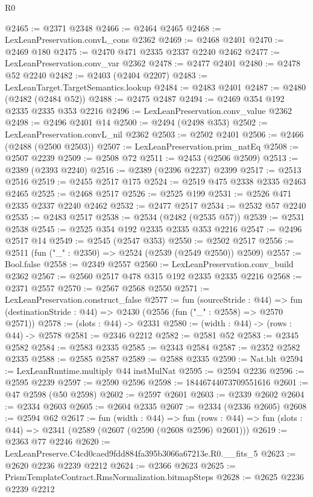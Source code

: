\begin{lexlean}{R0}
\begin{coremodule}
@2465 := @2371 @2348
@2466 := @2464 @2465
@2468 := LexLeanPreservation.convL_cons @2362
@2469 := @2468 @2401
@2470 := @2469 @180
@2475 := @2470 @471 @2335 @2337 @2240 @2462
@2477 := LexLeanPreservation.conv_var @2362
@2478 := @2477 @2401
@2480 := @2478 @52 @2240
@2482 := @2403 (@2404 @2207)
@2483 := LexLeanTarget.TargetSemantics.lookup
@2484 := @2483 @2401
@2487 := @2480 (@2482 (@2484 @52))
@2488 := @2475 @2487
@2494 := @2469 @354 @192 @2335 @2335 @353 @2216
@2496 := LexLeanPreservation.conv_value @2362
@2498 := @2496 @2401 @14
@2500 := @2494 (@2498 @353)
@2502 := LexLeanPreservation.convL_nil @2362
@2503 := @2502 @2401
@2506 := @2466 (@2488 (@2500 @2503))
@2507 := LexLeanPreservation.prim_natEq
@2508 := @2507 @2239
@2509 := @2508 @72
@2511 := @2453 (@2506 @2509)
@2513 := @2389 (@2393 @2240)
@2516 := @2389 (@2396 @2237) @2399
@2517 := @2513 @2516
@2519 := @2455 @2517 @175
@2524 := @2519 @475 @2338 @2335 @2463 @2465
@2525 := @2468 @2517
@2526 := @2525 @199
@2531 := @2526 @471 @2335 @2337 @2240 @2462
@2532 := @2477 @2517
@2534 := @2532 @57 @2240
@2535 := @2483 @2517
@2538 := @2534 (@2482 (@2535 @57))
@2539 := @2531 @2538
@2545 := @2525 @354 @192 @2335 @2335 @353 @2216
@2547 := @2496 @2517 @14
@2549 := @2545 (@2547 @353)
@2550 := @2502 @2517
@2556 := @2511 (fun ("_" : @2350) => @2524 (@2539 (@2549 @2550)) @2509)
@2557 := Bool.false
@2558 := @2349 @2557
@2560 := LexLeanPreservation.conv_build @2362
@2567 := @2560 @2517 @478 @315 @192 @2335 @2335 @2216
@2568 := @2371 @2557
@2570 := @2567 @2568 @2550
@2571 := LexLeanPreservation.construct_false
@2577 := fun (sourceStride : @44) =>
  fun (destinationStride : @44) => @2430 (@2556 (fun ("_" : @2558) => @2570 @2571))
@2578 := (slots : @44) -> @2331
@2580 := (width : @44) -> (rows : @44) -> @2578
@2581 := @2346 @2212
@2582 := @2581 @52
@2583 := @2345 @2582
@2584 := @2583 @2335
@2585 := @2343 @2584
@2587 := @2352 @2582 @2335
@2588 := @2585 @2587
@2589 := @2588 @2335
@2590 := Nat.blt
@2594 := LexLeanRuntime.multiply @44 instMulNat
@2595 := @2594 @2236
@2596 := @2595 @2239
@2597 := @2590 @2596
@2598 := 18446744073709551616
@2601 := @47 @2598 (@50 @2598)
@2602 := @2597 @2601
@2603 := @2339 @2602
@2604 := @2334 @2603
@2605 := @2604 @2335
@2607 := @2334 (@2336 @2605)
@2608 := @2594 @62
@2617 := fun (width : @44) =>
  fun (rows : @44) => fun (slots : @44) => @2341 (@2589 (@2607 (@2590 (@2608 @2596) @2601)))
@2619 := @2363 @77 @2246
@2620 := LexLeanPreserve.C4cd0caed9fdd884fa395b3066a67213e.R0.__fits_5
@2623 := @2620 @2236 @2239 @2212
@2624 := @2366 @2623
@2625 := PrismTemplateContract.RmsNormalization.bitmapSteps
@2628 := @2625 @2236 @2239 @2212

\end{coremodule}
\end{lexlean}
